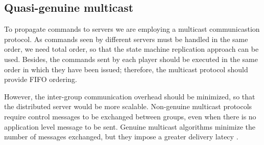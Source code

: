 \documentclass[]{usiinfprospectus}
\begin{document}
%



\subsection{Quasi-genuine multicast} \label{sec:optmcast}

To propagate commands to servers we are employing a multicast communicastion protocol. 
As commands seen by different servers must be handled in the same order, we need total order, so that the state machine replication approach can be used. Besides, the commands sent by each player should be executed in the same order in which they have been issued; therefore, the multicast protocol should provide FIFO ordering.

However, the inter-group communication overhead should be minimized, so that the distributed server would be more scalable. Non-genuine multicast protocols \cite{schiper2009gng} require control messages to be exchanged between groups, even when there is no application level message to be sent. Genuine multicast algorithms minimize the number of messages exchanged, but they impose a greater delivery latecy \cite{schiper2008ica}.
\end{document}

